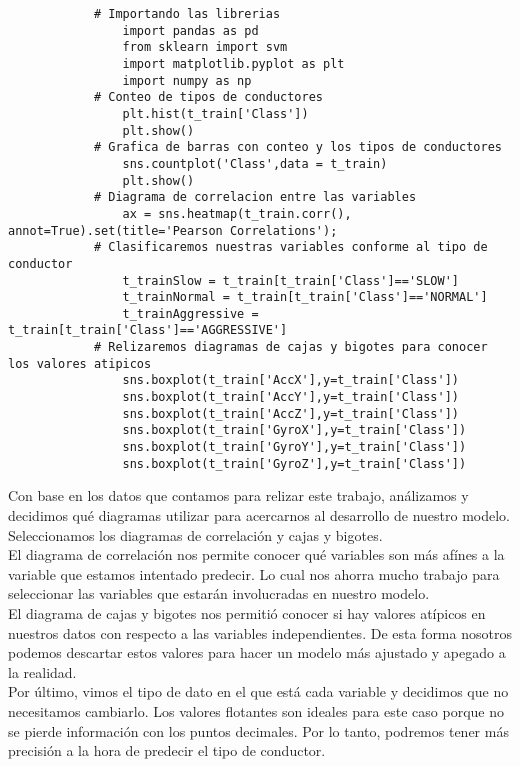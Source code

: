 \documentclass{article}
\begin{document}
        \begin{lstlisting}
            # Importando las librerias
                import pandas as pd
                from sklearn import svm
                import matplotlib.pyplot as plt
                import numpy as np
            # Conteo de tipos de conductores
                plt.hist(t_train['Class'])
                plt.show()
            # Grafica de barras con conteo y los tipos de conductores
                sns.countplot('Class',data = t_train)
                plt.show()
            # Diagrama de correlacion entre las variables
                ax = sns.heatmap(t_train.corr(), annot=True).set(title='Pearson Correlations');
            # Clasificaremos nuestras variables conforme al tipo de conductor
                t_trainSlow = t_train[t_train['Class']=='SLOW']
                t_trainNormal = t_train[t_train['Class']=='NORMAL']
                t_trainAggressive = t_train[t_train['Class']=='AGGRESSIVE']
            # Relizaremos diagramas de cajas y bigotes para conocer los valores atipicos
                sns.boxplot(t_train['AccX'],y=t_train['Class'])
                sns.boxplot(t_train['AccY'],y=t_train['Class'])
                sns.boxplot(t_train['AccZ'],y=t_train['Class'])
                sns.boxplot(t_train['GyroX'],y=t_train['Class'])
                sns.boxplot(t_train['GyroY'],y=t_train['Class'])
                sns.boxplot(t_train['GyroZ'],y=t_train['Class'])
        \end{lstlisting}

        Con base en los datos que contamos para relizar este trabajo, análizamos y decidimos qué diagramas utilizar para acercarnos al desarrollo de nuestro modelo. Seleccionamos los diagramas de correlación y cajas y bigotes. \\
        El diagrama de correlación nos permite conocer qué variables son más afínes a la variable que estamos intentado predecir. Lo cual nos ahorra mucho trabajo para seleccionar las variables que estarán involucradas en nuestro modelo. \\
        El diagrama de cajas y bigotes nos permitió conocer si hay valores atípicos en nuestros datos con respecto a las variables independientes. De esta forma nosotros podemos descartar estos valores para hacer un modelo más ajustado y apegado a la realidad. \\
        Por último, vimos el tipo de dato en el que está cada variable y decidimos que no necesitamos cambiarlo. Los valores flotantes son ideales para este caso porque no se pierde información con los puntos decimales. Por lo tanto, podremos tener más precisión a la hora de predecir el tipo de conductor.
\end{document}
